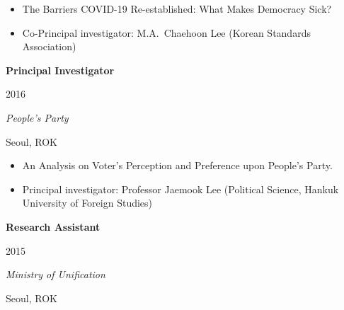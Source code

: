 \documentclass[
  16,
]{article}
\providecommand{\tightlist}{%
  \setlength{\itemsep}{0pt}\setlength{\parskip}{0pt}}\usepackage{longtable,booktabs,array}
\begin{document}
\begin{itemize}
\tightlist
\item
  The Barriers COVID-19 Re-established: What Makes Democracy Sick?
\item
  Co-Principal investigator: M.A.~Chaehoon Lee (Korean Standards
  Association)
\end{itemize}

\vspace{7pt}

\begin{large}
  \begin{multicols}{2}
    \begin{flushleft}{\bf Principal Investigator}\end{flushleft}
    \begin{flushright}2016\end{flushright}
  \end{multicols}
  \vspace{-0.17cm}
  \begin{multicols}{2}
    \begin{flushleft}\textit{People’s Party}\end{flushleft}
    \begin{flushright}Seoul, ROK\end{flushright}
  \end{multicols}
  \end{large}
\vspace{-0.16cm}

\begin{itemize}
\tightlist
\item
  An Analysis on Voter's Perception and Preference upon People's Party.
\item
  Principal investigator: Professor Jaemook Lee (Political Science,
  Hankuk University of Foreign Studies)
\end{itemize}

\vspace{7pt}

\begin{large}
  \begin{multicols}{2}
    \begin{flushleft}{\bf Research Assistant}\end{flushleft}
    \begin{flushright}2015\end{flushright}
  \end{multicols}
  \vspace{-0.17cm}
  \begin{multicols}{2}
    \begin{flushleft}\textit{Ministry of Unification}\end{flushleft}
    \begin{flushright}Seoul, ROK\end{flushright}
  \end{multicols}
  \end{large}
\vspace{-0.16cm}
\end{document}
